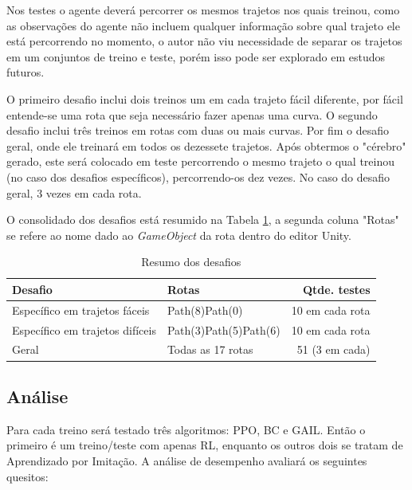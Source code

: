 Nos testes o agente deverá percorrer os mesmos trajetos nos quais treinou, como as observações do agente não incluem qualquer informação sobre qual trajeto ele está percorrendo no momento, o autor não viu necessidade de separar os trajetos em um conjuntos de treino e teste, porém isso pode ser explorado em estudos futuros. 

O primeiro desafio inclui dois treinos um em cada trajeto fácil diferente, por fácil entende-se uma rota que seja necessário fazer apenas uma curva. O segundo desafio inclui três treinos em rotas com duas ou mais curvas. Por fim o desafio geral, onde ele treinará em todos os dezessete trajetos. Após obtermos o "cérebro"{} gerado, este será colocado em teste percorrendo o mesmo trajeto o qual treinou (no caso dos desafios específicos), percorrendo-os dez vezes. No caso do desafio geral, 3 vezes em cada rota.

O consolidado dos desafios está resumido na Tabela \ref{tabela-testes}, a segunda coluna "Rotas"{} se refere ao nome dado ao \textit{GameObject} da rota dentro do editor Unity.

\begin{table}[htpb]
   \centering
   \caption{Resumo dos desafios}
   \label{tabela-testes}
   \begin{tabular}{|l|p{4cm}|r|}
        \hline
        \small{Desafio}                      & \small{Rotas}                              & \small{Qtde. testes}     \\ \hline
         Específico em trajetos fáceis       & Path(8)\newline Path(0)                    &      10 em cada rota     \\ \hline
         Específico em trajetos difíceis     & Path(3)\newline Path(5)\newline Path(6)    &      10 em cada rota     \\ \hline
         Geral                               & Todas as 17 rotas                          &      51 (3 em cada)      \\ \hline
   \end{tabular}
\end{table}

\subsection{Análise}
Para cada treino será testado três algoritmos: PPO, BC e GAIL. Então o primeiro é um treino/teste com apenas RL, enquanto os outros dois se tratam de Aprendizado por Imitação. A análise de desempenho avaliará os seguintes quesitos:

